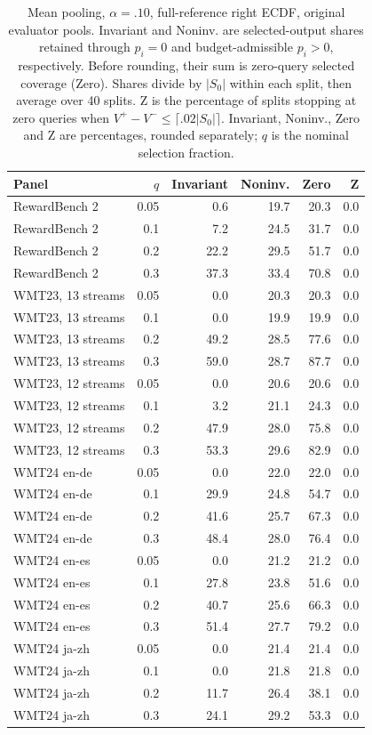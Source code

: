 \begin{table}[t]
\centering\small
\begin{tabular}{lrrrrr}
\toprule
Panel & $q$ & Invariant & Noninv. & Zero & Z \\
\midrule
RewardBench 2 & 0.05 & 0.6 & 19.7 & 20.3 & 0.0 \\
RewardBench 2 & 0.1 & 7.2 & 24.5 & 31.7 & 0.0 \\
RewardBench 2 & 0.2 & 22.2 & 29.5 & 51.7 & 0.0 \\
RewardBench 2 & 0.3 & 37.3 & 33.4 & 70.8 & 0.0 \\
WMT23, 13 streams & 0.05 & 0.0 & 20.3 & 20.3 & 0.0 \\
WMT23, 13 streams & 0.1 & 0.0 & 19.9 & 19.9 & 0.0 \\
WMT23, 13 streams & 0.2 & 49.2 & 28.5 & 77.6 & 0.0 \\
WMT23, 13 streams & 0.3 & 59.0 & 28.7 & 87.7 & 0.0 \\
WMT23, 12 streams & 0.05 & 0.0 & 20.6 & 20.6 & 0.0 \\
WMT23, 12 streams & 0.1 & 3.2 & 21.1 & 24.3 & 0.0 \\
WMT23, 12 streams & 0.2 & 47.9 & 28.0 & 75.8 & 0.0 \\
WMT23, 12 streams & 0.3 & 53.3 & 29.6 & 82.9 & 0.0 \\
WMT24 en-de & 0.05 & 0.0 & 22.0 & 22.0 & 0.0 \\
WMT24 en-de & 0.1 & 29.9 & 24.8 & 54.7 & 0.0 \\
WMT24 en-de & 0.2 & 41.6 & 25.7 & 67.3 & 0.0 \\
WMT24 en-de & 0.3 & 48.4 & 28.0 & 76.4 & 0.0 \\
WMT24 en-es & 0.05 & 0.0 & 21.2 & 21.2 & 0.0 \\
WMT24 en-es & 0.1 & 27.8 & 23.8 & 51.6 & 0.0 \\
WMT24 en-es & 0.2 & 40.7 & 25.6 & 66.3 & 0.0 \\
WMT24 en-es & 0.3 & 51.4 & 27.7 & 79.2 & 0.0 \\
WMT24 ja-zh & 0.05 & 0.0 & 21.4 & 21.4 & 0.0 \\
WMT24 ja-zh & 0.1 & 0.0 & 21.8 & 21.8 & 0.0 \\
WMT24 ja-zh & 0.2 & 11.7 & 26.4 & 38.1 & 0.0 \\
WMT24 ja-zh & 0.3 & 24.1 & 29.2 & 53.3 & 0.0 \\
\bottomrule
\end{tabular}
\caption{Mean pooling, $\alpha=.10$, full-reference right ECDF, original evaluator pools. Invariant and Noninv. are selected-output shares retained through $p_i=0$ and budget-admissible $p_i>0$, respectively. Before rounding, their sum is zero-query selected coverage (Zero). Shares divide by $|S_0|$ within each split, then average over 40 splits. Z is the percentage of splits stopping at zero queries when $V^+-V^-\le\lceil.02|S_0|\rceil$. Invariant, Noninv., Zero and Z are percentages, rounded separately; $q$ is the nominal selection fraction.}
\label{tab:zero-decomposition-mean}
\end{table}

